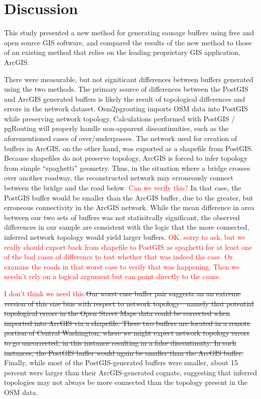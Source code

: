 \documentclass[11pt,letterpaper]{article} %
\begin{document}
\section*{Discussion}
This study presented a new method for generating sausage buffers using free and open source GIS software, and compared the results of the new method to those of an existing method that relies on the leading proprietary GIS application, ArcGIS. 

There were measurable, but not signiticant differences between buffers generated using the two methods. The primary source of differences between the PostGIS
and ArcGIS generated buffers is likely the result of topological differences
and errors in the network dataset. Osm2pgrouting imports OSM data into PostGIS while preserving network topology. Calculations performed with
PostGIS / pgRouting will properly handle non-apparent discontinuities,
such as the aforementioned cases of over/underpasses. The network used for creation of buffers in ArcGIS, on the other hand,
was exported as a shapefile from PostGIS. Because shapefiles do not preserve topology,
ArcGIS is forced to infer topology from simple ``spaghetti'' geometry. Thus, in the 
situation where a bridge crosses over another roadway, the
reconstructed network may erroneously connect between the bridge and
the road below. \textcolor{red}{Can we verify this?} In that case, the PostGIS
buffer would be smaller than the ArcGIS buffer, due to the greater, but erroneous 
connectivity in the ArcGIS network. While the mean difference in area
between our two sets of buffers was not statisitcally significant, the observed differences in our sample are consistent with the
logic that the more connected, inferred network topology would yield
larger buffers. \textcolor{red}{OK, sorry to ask, but we really should export back from shapefile to PostGIS as spaghetti for at least one of the bad cases of difference to test whether that was indeed the case. Or examine the roads in that worst case to verify that was happening. Then we needn't rely on a logical argument but can point directly to the cause.}

\textcolor{red}{I don't think we need this.}\st{Our worst case buffer pair suggests an an extreme version of this size
bias with respect to network topology---namely that potential
topological errors in the Open Street Maps data could be corrected
when imported into ArcGIS via a shapefile. These two buffers are
located in a remote portion of Central Washington, where we might
expect network topology errors to go uncorrected, in this instance
resulting in a false discontinuity. In such instances, the PostGIS
buffer would again be smaller than the ArcGIS buffer.} Finally, while
most of the PostGIS-generated buffers were smaller, about 15 percent
were larger than their ArcGIS-generated cognate, suggesting that
inferred topologies may not always be more connected than the topology
present in the OSM data.
\end{document}
